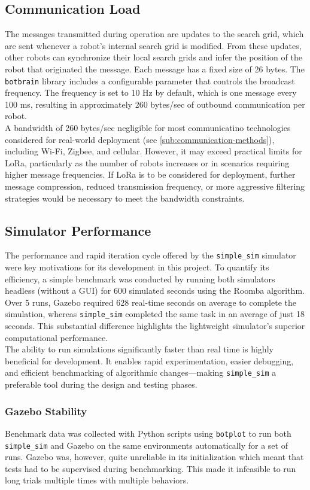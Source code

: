 \subsection{Communication Load}
The messages transmitted during operation are updates to the search grid, which are sent whenever a robot’s internal search grid is modified. From these updates, other robots can synchronize their local search grids and infer the position of the robot that originated the message. Each message has a fixed size of 26 bytes. The \texttt{botbrain} library includes a configurable parameter that controls the broadcast frequency. The frequency is set to 10 Hz by default, which is one message every 100 ms, resulting in approximately 260 bytes/sec of outbound communication per robot. \\

A bandwidth of 260 bytes/sec negligible for most communicatino technologies considered for real-world deployment (see \cref{sub:communication-methods}), including Wi-Fi, Zigbee, and cellular. However, it may exceed practical limits for LoRa, particularly as the number of robots increases or in scenarios requiring higher message frequencies. If LoRa is to be considered for deployment, further message compression, reduced transmission frequency, or more aggressive filtering strategies would be necessary to meet the bandwidth constraints.

\subsection{Simulator Performance}
\label{sec:simulator-performance}
The performance and rapid iteration cycle offered by the \texttt{simple\_sim} simulator were key motivations for its development in this project. To quantify its efficiency, a simple benchmark was conducted by running both simulators headless (without a GUI) for 600 simulated seconds using the Roomba algorithm. Over 5 runs, Gazebo required 628 real-time seconds on average to complete the simulation, whereas \texttt{simple\_sim} completed the same task in an average of just 18 seconds. This substantial difference highlights the lightweight simulator’s superior computational performance.\\

The ability to run simulations significantly faster than real time is highly beneficial for development. It enables rapid experimentation, easier debugging, and efficient benchmarking of algorithmic changes—making \texttt{simple\_sim} a preferable tool during the design and testing phases.

\subsubsection{Gazebo Stability}
Benchmark data was collected with Python scripts using \texttt{botplot} to run both \texttt{simple\_sim} and Gazebo on the same environments automatically for a set of runs. Gazebo was, however, quite unreliable in its initialization which meant that tests had to be supervised during benchmarking. This made it infeasible to run long trials multiple times with multiple behaviors.

